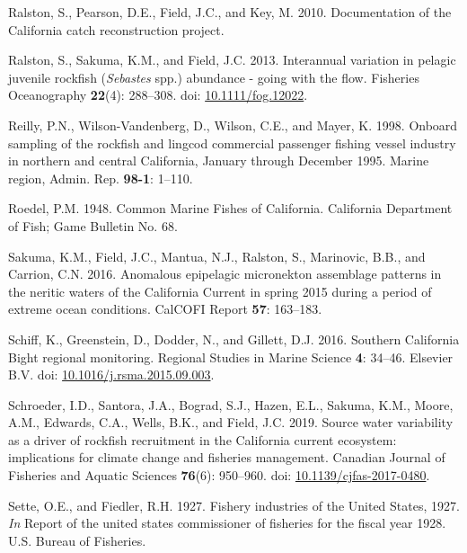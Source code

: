 \documentclass[11pt,
  english,
]{article}
\newlength{\cslhangindent}
\newenvironment{CSLReferences}[2] %
 {%
  \setlength{\parindent}{0pt}
  \ifodd #1 \everypar{\setlength{\hangindent}{\cslhangindent}}\ignorespaces\fi
  \ifnum #2 > 0
  \setlength{\parskip}{#2\baselineskip}
  \fi
 }%
 {}
\begin{document}
\begin{CSLReferences}{1}{0}
\leavevmode{}%
Ralston, S., Pearson, D.E., Field, J.C., and Key, M. 2010. {Documentation of the California catch reconstruction project}.

\leavevmode{}%
Ralston, S., Sakuma, K.M., and Field, J.C. 2013. {Interannual variation in pelagic juvenile rockfish (\emph{Sebastes} spp.) abundance - going with the flow}. Fisheries Oceanography \textbf{22}(4): 288--308. doi: \href{https://doi.org/10.1111/fog.12022}{10.1111/fog.12022}.

\leavevmode{}%
Reilly, P.N., Wilson-Vandenberg, D., Wilson, C.E., and Mayer, K. 1998. {Onboard sampling of the rockfish and lingcod commercial passenger fishing vessel industry in northern and central California, January through December 1995.} Marine region, Admin. Rep. \textbf{98-1}: 1--110.

\leavevmode{}%
Roedel, P.M. 1948. {Common Marine Fishes of California}. California Department of Fish; Game Bulletin No. 68.

\leavevmode{}%
Sakuma, K.M., Field, J.C., Mantua, N.J., Ralston, S., Marinovic, B.B., and Carrion, C.N. 2016. {Anomalous epipelagic micronekton assemblage patterns in the neritic waters of the California Current in spring 2015 during a period of extreme ocean conditions}. CalCOFI Report \textbf{57}: 163--183.

\leavevmode{}%
Schiff, K., Greenstein, D., Dodder, N., and Gillett, D.J. 2016. {Southern California Bight regional monitoring}. Regional Studies in Marine Science \textbf{4}: 34--46. Elsevier B.V. doi: \href{https://doi.org/10.1016/j.rsma.2015.09.003}{10.1016/j.rsma.2015.09.003}.

\leavevmode{}%
Schroeder, I.D., Santora, J.A., Bograd, S.J., Hazen, E.L., Sakuma, K.M., Moore, A.M., Edwards, C.A., Wells, B.K., and Field, J.C. 2019. {Source water variability as a driver of rockfish recruitment in the California current ecosystem: implications for climate change and fisheries management}. Canadian Journal of Fisheries and Aquatic Sciences \textbf{76}(6): 950--960. doi: \href{https://doi.org/10.1139/cjfas-2017-0480}{10.1139/cjfas-2017-0480}.

\leavevmode{}%
Sette, O.E., and Fiedler, R.H. 1927. {Fishery industries of the United States, 1927}. \emph{In} Report of the united states commissioner of fisheries for the fiscal year 1928. U.S. Bureau of Fisheries.


\end{CSLReferences}
\end{document}

